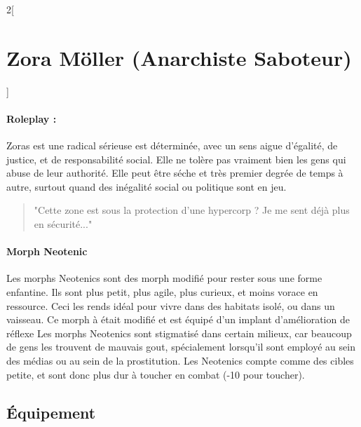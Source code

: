 \documentclass[a4paper,9pt]{article}
\begin{document}
\begin{multicols}{2}[\section*{Zora Möller (Anarchiste Saboteur)}]
   \paragraph{Roleplay :} Zoras est une radical sérieuse est déterminée, avec un sens aigue
   d'égalité, de justice, et de responsabilité social.
   Elle ne tolère pas vraiment bien les gens qui abuse de leur authorité.
   Elle peut être séche et très premier degrée de temps à autre, surtout quand des
   inégalité social ou politique sont en jeu.

   \begin{quote}
      "Cette zone est sous la protection d'une hypercorp ? Je me sent déjà plus en sécurité..."
   \end{quote}

   \paragraph{Morph Neotenic}
   Les morphs Neotenics sont des morph modifié pour rester sous une forme
   enfantine.
   Ils sont plus petit, plus agile, plus curieux, et moins vorace en ressource.
   Ceci les rends idéal pour vivre dans des habitats isolé, ou dans un vaisseau.
   Ce morph à était modifié et est équipé d'un implant d'amélioration de réflexe
   Les morphs Neotenics sont stigmatisé dans certain milieux, car beaucoup de gens
   les trouvent de mauvais gout, spécialement lorsqu'il sont employé au sein
   des médias ou au sein de la prostitution.
   Les Neotenics compte comme des cibles petite, et sont donc plus dur
   à toucher en combat (-10 pour toucher).

   \subsection*{Équipement}


\end{multicols}
\end{document}
